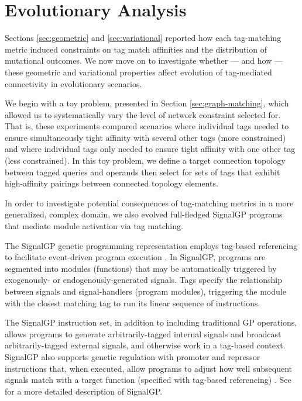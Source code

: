 \section{Evolutionary Analysis} \label{sec:evolutionary}

Sections \ref{sec:geometric} and \ref{sec:variational} reported how each tag-matching metric induced constraints on tag match affinities and the distribution of mutational outcomes.
We now move on to investigate whether --- and how ---  these geometric and variational properties affect evolution of tag-mediated connectivity in evolutionary scenarios.

We begin with a toy problem, presented in Section \ref{sec:graph-matching}, which allowed us to systematically vary the level of network constraint selected for.
That is, these experiments compared scenarios where individual tags needed to ensure simultaneously tight affinity with several other tags (more constrained) and where individual tags only needed to ensure tight affinity with one other tag (less constrained).
In this toy problem, we define a target connection topology between tagged queries and operands then select for sets of tags that exhibit high-affinity pairings between connected topology elements.

In order to investigate potential consequences of tag-matching metrics in a more generalized, complex domain, we also evolved full-fledged SignalGP programs that mediate module activation via tag matching.

The SignalGP genetic programming representation employs tag-based referencing to facilitate event-driven program execution \citep{lalejini2018evolving}.
In SignalGP, programs are segmented into modules (functions) that may be automatically triggered by exogenously- or endogenously-generated signals.
Tags specify the relationship between signals and signal-handlers (program modules), triggering the module with the closest matching tag to run its linear sequence of instructions.

The SignalGP instruction set, in addition to including traditional GP operations, allows programs to generate arbitrarily-tagged internal signals and broadcast arbitrarily-tagged external signals, and otherwise work in a tag-based context.
SignalGP also supports genetic regulation with promoter and repressor instructions that, when executed, allow programs to adjust how well subsequent signals match with a target function (specified with tag-based referencing) \citep{lalejini2021tag}.
See \cite{lalejini2018evolving} for a more detailed description of SignalGP.

